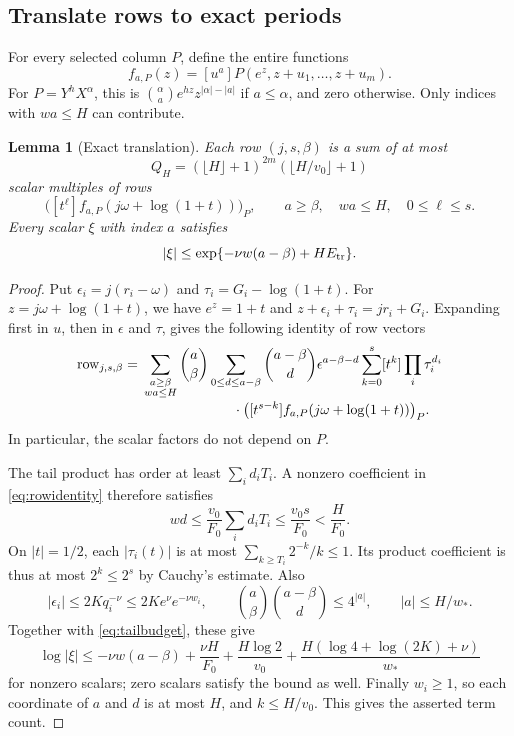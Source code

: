 \documentclass[11pt]{article}
\newtheorem{lemma}[theorem]{Lemma}
\theoremstyle{definition}
\theoremstyle{remark}
\numberwithin{equation}{section}
\begin{document}
\subsection{Translate rows to exact periods}
For every selected column \(P\), define the entire functions
\begin{equation}\label{eq:functions}
 f_{a,P}(z)=[u^a]P(e^z,z+u_1,\ldots,z+u_m).
\end{equation}
For \(P=Y^hX^\alpha\), this is
\(\binom\alpha a e^{hz}z^{|\alpha|-|a|}\) if \(a\le\alpha\),
and zero otherwise. Only indices with \(wa\le H\) can contribute.

\begin{lemma}[Exact translation]\label{lem:translation}
Each row \((j,s,\beta)\) is a sum of at most
\[
 Q_H=(\lfloor H\rfloor+1)^{2m}(\lfloor H/v_0\rfloor+1)
\]
scalar multiples of rows
\[
 \bigl([t^\ell]f_{a,P}(j\omega+\log(1+t))\bigr)_P,
 \qquad a\ge\beta,\quad wa\le H,\quad 0\le\ell\le s.
\]
Every scalar \(\xi\) with index \(a\) satisfies
\begin{equation}\label{eq:scalarbound}
 |\xi|\le\exp\{-\nu w(a-\beta)+HE_{\rm tr}\}.
\end{equation}
\end{lemma}
\begin{proof}
Put \(\epsilon_i=j(r_i-\omega)\) and
\(\tau_i=G_i-\log(1+t)\). For \(z=j\omega+\log(1+t)\), we have
\(e^z=1+t\) and \(z+\epsilon_i+\tau_i=jr_i+G_i\).
Expanding first in \(u\), then in \(\epsilon\) and \(\tau\), gives
the following identity of row vectors
\begin{align}
 \mathrm{row}_{j,s,\beta}
 ={}&\sum_{\substack{a\ge\beta\\wa\le H}}\binom a\beta
 \sum_{0\le d\le a-\beta}\binom{a-\beta}d\epsilon^{a-\beta-d}
 \sum_{k=0}^s[t^k]\prod_i\tau_i^{d_i}\notag\\[-2pt]
 &\hspace{23mm}\cdot
 \bigl([t^{s-k}]f_{a,P}(j\omega+\log(1+t))\bigr)_P.
 \label{eq:rowidentity}
\end{align}
In particular, the scalar factors do not depend on \(P\).

The tail product has order at least \(\sum_i d_iT_i\). A nonzero
coefficient in \eqref{eq:rowidentity} therefore satisfies
\begin{equation}\label{eq:tailbudget}
 wd\le\frac{v_0}{F_0}\sum_i d_iT_i
 \le\frac{v_0s}{F_0}<\frac H{F_0}.
\end{equation}
On \(|t|=1/2\), each \(|\tau_i(t)|\) is at most
\(\sum_{k\ge T_i}2^{-k}/k\le1\). Its product coefficient is thus
at most \(2^k\le2^s\) by Cauchy's estimate. Also
\[
 |\epsilon_i|\le2Kq_i^{-\nu}
 \le2Ke^\nu e^{-\nu w_i},\qquad
 \binom a\beta\binom{a-\beta}d\le4^{|a|},\qquad |a|\le H/w_*.
\]
Together with \eqref{eq:tailbudget}, these give
\[
 \log|\xi|\le-\nu w(a-\beta)+\frac{\nu H}{F_0}
 +\frac{H\log2}{v_0}
 +\frac{H(\log4+\log(2K)+\nu)}{w_*}
\]
for nonzero scalars; zero scalars satisfy the bound as well.
Finally \(w_i\ge1\), so each coordinate of \(a\) and \(d\) is at
most \(H\), and \(k\le H/v_0\). This gives the asserted term count.
\end{proof}
\end{document}
